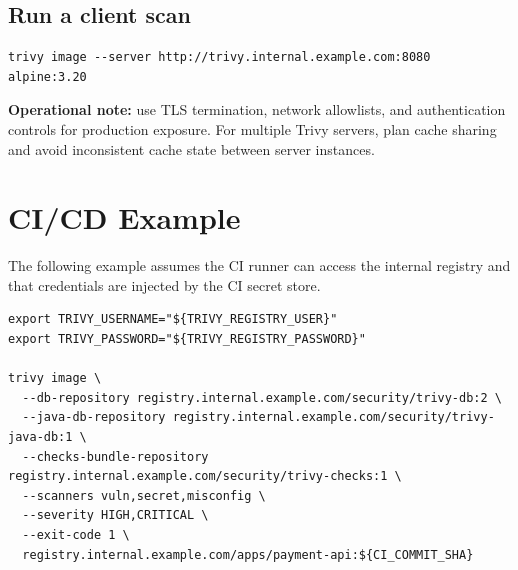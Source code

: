 \documentclass[10pt]{article}
\begin{document}
\subsection{Run a client scan}
\begin{verbatim}
trivy image --server http://trivy.internal.example.com:8080 alpine:3.20
\end{verbatim}

\textbf{Operational note:} use TLS termination, network allowlists, and authentication controls for production exposure. For multiple Trivy servers, plan cache sharing and avoid inconsistent cache state between server instances.

\section{CI/CD Example}
The following example assumes the CI runner can access the internal registry and that credentials are injected by the CI secret store.

\begin{verbatim}
export TRIVY_USERNAME="${TRIVY_REGISTRY_USER}"
export TRIVY_PASSWORD="${TRIVY_REGISTRY_PASSWORD}"

trivy image \
  --db-repository registry.internal.example.com/security/trivy-db:2 \
  --java-db-repository registry.internal.example.com/security/trivy-java-db:1 \
  --checks-bundle-repository registry.internal.example.com/security/trivy-checks:1 \
  --scanners vuln,secret,misconfig \
  --severity HIGH,CRITICAL \
  --exit-code 1 \
  registry.internal.example.com/apps/payment-api:${CI_COMMIT_SHA}
\end{verbatim}
\end{document}
